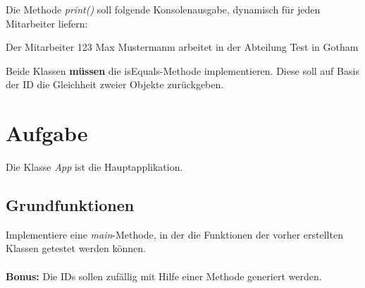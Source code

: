 \documentclass[12pt, oneside]{article}   	%
\begin{document}
Die Methode \textit{print()} soll folgende Konsolenausgabe, dynamisch für jeden \\ Mitarbeiter liefern: \\
\vspace{0.1cm}

Der Mitarbeiter 	123 Max Mustermanm  arbeitet in der Abteilung Test in Gotham
\vspace{1cm}

Beide Klassen \textbf{müssen} die isEquals-Methode implementieren. Diese soll auf Basis der ID die Gleichheit zweier Objekte zurückgeben.

\newpage

\section{Aufgabe}
Die Klasse \textit{App} ist die Hauptapplikation. 

\subsection{Grundfunktionen}
Implementiere eine \textit{main}-Methode, in der die Funktionen der vorher erstellten Klassen getestet werden können. \\ \\

\textbf{Bonus: } Die IDs sollen zufällig mit Hilfe einer Methode generiert werden.
\end{document}
